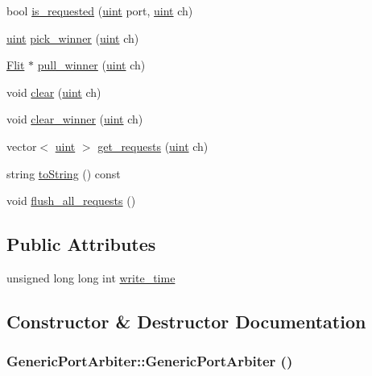 \begin{CompactItemize}
bool \hyperlink{classGenericPortArbiter_b94c8e8e707e00e3265008691fd7c696}{is\_\-requested} (\hyperlink{outputBuffer_8h_91ad9478d81a7aaf2593e8d9c3d06a14}{uint} port, \hyperlink{outputBuffer_8h_91ad9478d81a7aaf2593e8d9c3d06a14}{uint} ch)
\item 
\hyperlink{outputBuffer_8h_91ad9478d81a7aaf2593e8d9c3d06a14}{uint} \hyperlink{classGenericPortArbiter_528c492e74ec10b4ffa2a87d1454b446}{pick\_\-winner} (\hyperlink{outputBuffer_8h_91ad9478d81a7aaf2593e8d9c3d06a14}{uint} ch)
\item 
\hyperlink{classFlit}{Flit} $\ast$ \hyperlink{classGenericPortArbiter_443e4f87ec15a53c4381d8870154b74d}{pull\_\-winner} (\hyperlink{outputBuffer_8h_91ad9478d81a7aaf2593e8d9c3d06a14}{uint} ch)
\item 
void \hyperlink{classGenericPortArbiter_0ae12cea5cad66f5ef59129e93248e11}{clear} (\hyperlink{outputBuffer_8h_91ad9478d81a7aaf2593e8d9c3d06a14}{uint} ch)
\item 
void \hyperlink{classGenericPortArbiter_63d8b70b6215000469874aa5659cc416}{clear\_\-winner} (\hyperlink{outputBuffer_8h_91ad9478d81a7aaf2593e8d9c3d06a14}{uint} ch)
\item 
vector$<$ \hyperlink{outputBuffer_8h_91ad9478d81a7aaf2593e8d9c3d06a14}{uint} $>$ \hyperlink{classGenericPortArbiter_cd5a78f1bf96701f5371bbcd601d9e53}{get\_\-requests} (\hyperlink{outputBuffer_8h_91ad9478d81a7aaf2593e8d9c3d06a14}{uint} ch)
\item 
string \hyperlink{classGenericPortArbiter_1ceacc98efaee4d98b4f65a401ea10e2}{toString} () const 
\item 
void \hyperlink{classGenericPortArbiter_b593b8edfe4586255c61cb0219f3fb86}{flush\_\-all\_\-requests} ()
\end{CompactItemize}
\subsection*{Public Attributes}
\begin{CompactItemize}
\item 
unsigned long long int \hyperlink{classGenericPortArbiter_bccdf314a1920de58357e0d2f62f427e}{write\_\-time}
\end{CompactItemize}


\subsection{Constructor \& Destructor Documentation}
\hypertarget{classGenericPortArbiter_d7a567eb5055a68231d045583ed8d5a7}{
\subsubsection[{GenericPortArbiter}]{\setlength{\rightskip}{0pt plus 5cm}GenericPortArbiter::GenericPortArbiter ()}}
\label{classGenericPortArbiter_d7a567eb5055a68231d045583ed8d5a7}



